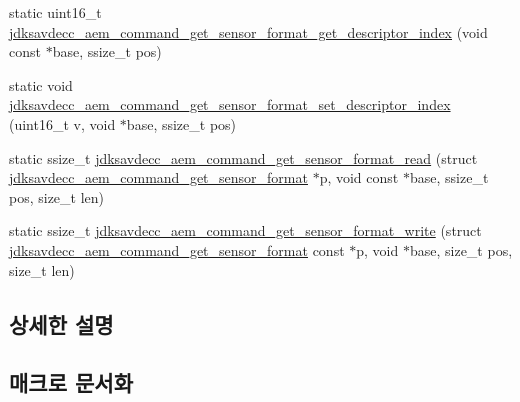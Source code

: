 \begin{DoxyCompactItemize}
\item 
static uint16\+\_\+t \hyperlink{group__command__get__sensor__format_ga46017ad6ebbfe7ef33c6070822329211}{jdksavdecc\+\_\+aem\+\_\+command\+\_\+get\+\_\+sensor\+\_\+format\+\_\+get\+\_\+descriptor\+\_\+index} (void const $\ast$base, ssize\+\_\+t pos)
\item 
static void \hyperlink{group__command__get__sensor__format_gaf58fb4ed5f7d54697336c927ccec1e2a}{jdksavdecc\+\_\+aem\+\_\+command\+\_\+get\+\_\+sensor\+\_\+format\+\_\+set\+\_\+descriptor\+\_\+index} (uint16\+\_\+t v, void $\ast$base, ssize\+\_\+t pos)
\item 
static ssize\+\_\+t \hyperlink{group__command__get__sensor__format_ga736ff5dd60ad25f9d259bfcdefdfa953}{jdksavdecc\+\_\+aem\+\_\+command\+\_\+get\+\_\+sensor\+\_\+format\+\_\+read} (struct \hyperlink{structjdksavdecc__aem__command__get__sensor__format}{jdksavdecc\+\_\+aem\+\_\+command\+\_\+get\+\_\+sensor\+\_\+format} $\ast$p, void const $\ast$base, ssize\+\_\+t pos, size\+\_\+t len)
\item 
static ssize\+\_\+t \hyperlink{group__command__get__sensor__format_ga411d08ada27ed8178d6b60a821e93bcf}{jdksavdecc\+\_\+aem\+\_\+command\+\_\+get\+\_\+sensor\+\_\+format\+\_\+write} (struct \hyperlink{structjdksavdecc__aem__command__get__sensor__format}{jdksavdecc\+\_\+aem\+\_\+command\+\_\+get\+\_\+sensor\+\_\+format} const $\ast$p, void $\ast$base, size\+\_\+t pos, size\+\_\+t len)
\end{DoxyCompactItemize}


\subsection{상세한 설명}


\subsection{매크로 문서화}
